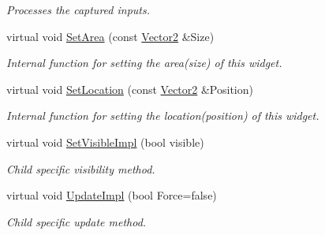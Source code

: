 \begin{DoxyCompactItemize}
\begin{DoxyCompactList}\small\item\em Processes the captured inputs. \item\end{DoxyCompactList}\item 
\hypertarget{classMezzanine_1_1UI_1_1Spinner_a9611805884095169e2f596858afd5a9f}{
virtual void \hyperlink{classMezzanine_1_1UI_1_1Spinner_a9611805884095169e2f596858afd5a9f}{SetArea} (const \hyperlink{classMezzanine_1_1Vector2}{Vector2} \&Size)}
\label{classMezzanine_1_1UI_1_1Spinner_a9611805884095169e2f596858afd5a9f}

\begin{DoxyCompactList}\small\item\em Internal function for setting the area(size) of this widget. \item\end{DoxyCompactList}\item 
\hypertarget{classMezzanine_1_1UI_1_1Spinner_ab1cc2c1fc926198c945e6db3b9741aa3}{
virtual void \hyperlink{classMezzanine_1_1UI_1_1Spinner_ab1cc2c1fc926198c945e6db3b9741aa3}{SetLocation} (const \hyperlink{classMezzanine_1_1Vector2}{Vector2} \&Position)}
\label{classMezzanine_1_1UI_1_1Spinner_ab1cc2c1fc926198c945e6db3b9741aa3}

\begin{DoxyCompactList}\small\item\em Internal function for setting the location(position) of this widget. \item\end{DoxyCompactList}\item 
\hypertarget{classMezzanine_1_1UI_1_1Spinner_abcb957f65d4ab3c2ce8e51ae92f0b5f9}{
virtual void \hyperlink{classMezzanine_1_1UI_1_1Spinner_abcb957f65d4ab3c2ce8e51ae92f0b5f9}{SetVisibleImpl} (bool visible)}
\label{classMezzanine_1_1UI_1_1Spinner_abcb957f65d4ab3c2ce8e51ae92f0b5f9}

\begin{DoxyCompactList}\small\item\em Child specific visibility method. \item\end{DoxyCompactList}\item 
\hypertarget{classMezzanine_1_1UI_1_1Spinner_a2aa7080294b00d95491bb502954137b7}{
virtual void \hyperlink{classMezzanine_1_1UI_1_1Spinner_a2aa7080294b00d95491bb502954137b7}{UpdateImpl} (bool Force=false)}
\label{classMezzanine_1_1UI_1_1Spinner_a2aa7080294b00d95491bb502954137b7}

\begin{DoxyCompactList}\small\item\em Child specific update method. \item\end{DoxyCompactList}\end{DoxyCompactItemize}
